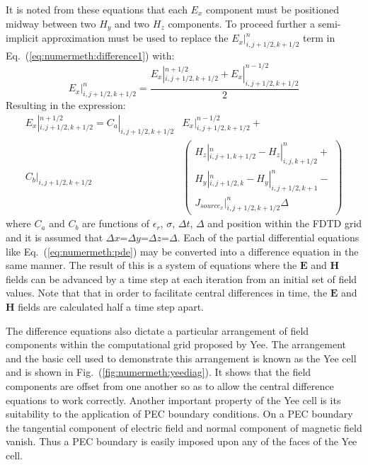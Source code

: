 \documentclass[a4paper, 12pt]{article}
\newcommand{\eq}[1]{Eq.\ (\ref{#1})}
\newcommand{\rfig}[1]{Fig.\ (\ref{#1})}
\begin{document}
	It is noted from these equations that each $E_x$ component must be
	positioned midway between two $H_y$ and two $H_z$ components. To
	proceed further a semi-implicit approximation must be used to replace
	the $E_x|^n_{i,j+1/2,k+1/2}$ term in \eq{eq:numermeth:difference1} with:
	\begin{equation}
		E_x|^n_{i,j+1/2,k+1/2}=\frac{E_x|^{n+1/2}_{i,j+1/2,k+1/2} + E_x|^{n-1/2}_{i,j+1/2,k+1/2}}{2}
		\label{eq:numermeth:semiimp}
	\end{equation}
	Resulting in the expression:
	\begin{align}
		E_x|^{n+1/2}_{i,j+1/2,k+1/2}=C_a|_{i,j+1/2,k+1/2}&E_x|^{n-1/2}_{i,j+1/2,k+1/2}+\nonumber\\
		C_b|_{i,j+1/2,k+1/2}&\left(\begin{array}{c}H_z|^n_{i,j+1,k+1/2} -
			H_z|^n_{i,j,k+1/2}+\\H_y|^n_{i,j+1/2,k}-H_y|^n_{i,j+1/2,k+1}-\\{J_{source_x}}|^n_{i,j+1/2,k+1/2}\Delta\end{array}
		\right)
	\end{align}
	where $C_a$ and $C_b$ are functions of $\epsilon_r$, $\sigma$, $\Delta
	t$, $\Delta$ and position within the FDTD grid and it is assumed
	that $\Delta x$=$\Delta y$=$\Delta z$=$\Delta$. Each of the partial differential
	equations like \eq{eq:numermeth:pde} may be converted into a
	difference equation in the same manner. The result of this is a system
	of equations where the $\mathbf{E}$ and $\mathbf{H}$ fields can be
	advanced by a time step at each iteration from an initial set of field
	values. Note that that in order to facilitate central differences in
	time, the $\mathbf{E}$ and $\mathbf{H}$ fields are calculated half a
	time step apart. 
	
	The difference equations also dictate a particular arrangement of
	field components within the computational grid proposed by Yee. The
	arrangement and the basic cell used to demonstrate this arrangement is
	known as the Yee cell and is shown in \rfig{fig:numermeth:yeediag}. It
	shows that the field components are offset from one another so as to
	allow the central difference equations to work correctly. Another
	important property of the Yee cell is its suitability to the
	application of PEC boundary conditions. On a PEC boundary the
	tangential component of electric field and normal component of
	magnetic field vanish. Thus a PEC boundary is easily imposed upon any
	of the faces of the Yee cell. 
	
\end{document}
